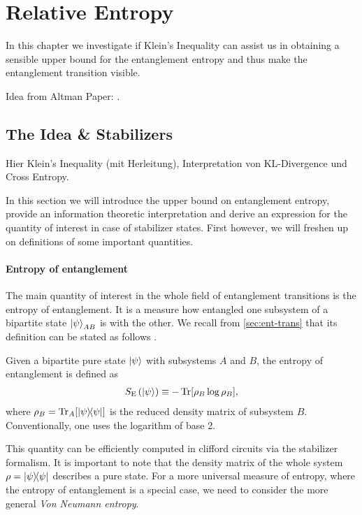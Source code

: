\chapter{Relative Entropy}
\label{ch:rel-ent}

In this chapter we investigate if Klein's Inequality can assist us in obtaining
a sensible upper bound for the entanglement entropy and thus make the
entanglement transition visible.

Idea from Altman Paper:
\cite{garrattProbingPostmeasurementEntanglement2023}.

\section{The Idea \& Stabilizers}
Hier Klein's Inequality (mit Herleitung), Interpretation von KL-Divergence und
Cross Entropy.

In this section we will introduce the upper bound on entanglement entropy,
provide an information theoretic interpretation and derive an expression for
the quantity of interest in case of stabilizer states. First however, we will
freshen up on definitions of some important quantities.
\subsubsection{Entropy of entanglement}
The main quantity of interest in the whole field of entanglement transitions is
the entropy of entanglement. It is a measure how entangled one subsystem of a
bipartite state $\ket{\psi}_{AB}$ is with the other. We recall from
\cref{sec:ent-trans} that its definition can be stated as follows
\cite{fattalEntanglementStabilizerFormalism2004}.
\begin{defn}\label{defn:entanglement-entropy}
  Given a bipartite pure state $\ket{\psi}$ with subsystems $A$ and $B$,
  the entropy of entanglement is defined as
  \begin{align}
    S_\mathrm{E}\left(\ket{\psi}\right) \equiv - \Tr[\rho_B \log \rho_B],
  \end{align}
  where $\rho_B = \Tr_A[\dyad{\psi}]$ is the reduced density matrix of subsystem
  $B$. Conventionally, one uses the logarithm of base 2.
\end{defn}
This quantity can be efficiently computed in clifford circuits via the
stabilizer formalism. It is important to note that the density matrix of the
whole system $\rho = \dyad{\psi}$ describes a pure state. For a more universal
measure of entropy, where the entropy of entanglement is a special case, we
need to consider the more general \emph{Von Neumann entropy}.
